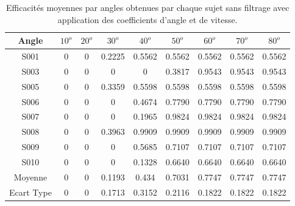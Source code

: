 \documentclass[letterpaper, twoside, 12pt, memoire, creativecommons, hyperref]{thETS}
\begin{document}
\begin{table}[ht]
	\caption{Efficacités moyennes par angles obtenues par chaque sujet sans filtrage avec application des coefficients d'angle et de vitesse. }
		\begin{tabular}{|c|c|c|c|c|c|c|c|c|}
		\hline
			Angle & $10^{o}$ & $20^{o}$ & $30^{o}$ & $40^{o}$ & $50^{o}$ & $60^{o}$ & $70^{o}$ & $80^{o}$\\
	    \hline
	    		S001 & 0 &  0 & 0.2225 & 0.5562 & 0.5562 & 0.5562 & 0.5562 & 0.5562\\
	    \hline
	    		S003 & 0 &  0 &  0 &  0 & 0.3817 & 0.9543 & 0.9543 & 0.9543\\
	    \hline
	    		S005 & 0 &  0 & 0.3359 & 0.5598 & 0.5598 & 0.5598 & 0.5598 & 0.5598\\
	    \hline
	    		S006 & 0 &  0 &  0 & 0.4674 & 0.7790 & 0.7790 & 0.7790 & 0.7790\\
	    \hline
	    		S007 & 0 &  0 &  0 & 0.1965 & 0.9824 & 0.9824 & 0.9824 & 0.9824\\
	    \hline
	    		S008 & 0 &  0 & 0.3963 & 0.9909 & 0.9909 & 0.9909 & 0.9909 & 0.9909\\
	    \hline
	    		S009 & 0 &  0 &  0 & 0.5685 & 0.7107 & 0.7107 & 0.7107 & 0.7107\\
	    \hline
	    		S010 & 0 &  0 &  0 & 0.1328 & 0.6640 & 0.6640 & 0.6640 & 0.6640\\
	    \hline
	    		Moyenne & 0 & 0 & 0.1193 & 0.434 & 0.7031 & 0.7747 & 0.7747 & 0.7747\\
	    \hline
	    		Ecart Type & 0 & 0 & 0.1713 & 0.3152 & 0.2116 & 0.1822 & 0.1822 & 0.1822\\
	    \hline
		\end{tabular}
	\label{tab:effanglecoeff}
\end{table}
\end{document}
